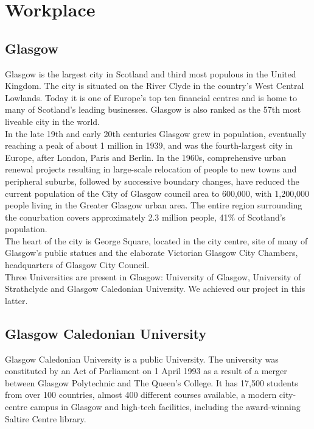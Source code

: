 \documentclass{scrreprt}
\begin{document}
		  \chapter{Workplace}
		  \section{Glasgow}%
		  Glasgow is the largest city in Scotland and third most populous in the United
		  Kingdom. The city is situated on the River Clyde in the country's West Central Lowlands.
		  Today it is one of Europe's top ten financial centres and is home to many of
		  Scotland's leading businesses. Glasgow is also ranked as the 57th most liveable city in the
		  world.\\

		  In the late 19th and early 20th centuries Glasgow grew in population, eventually
		  reaching a peak of about 1 million in 1939, and was the fourth-largest city in Europe, after
		  London, Paris and Berlin. In the 1960s, comprehensive urban renewal projects resulting in
		  large-scale relocation of people to new towns and peripheral suburbs, followed by
		  successive boundary changes, have reduced the current population of the City of Glasgow
		  council area to 600,000, with 1,200,000 people living in the Greater Glasgow urban area. The
		  entire region surrounding the conurbation covers approximately 2.3 million people, 41\% of
		  Scotland's population.\\

		  The heart of the city is George Square, located in the city centre, site of many of
		  Glasgow's public statues and the elaborate Victorian Glasgow City Chambers, headquarters
		  of Glasgow City Council.\\

		  Three Universities are present in Glasgow: University of Glasgow, University of
		  Strathclyde and Glasgow Caledonian University. We achieved our project in this latter.

		  \section{Glasgow Caledonian University}%
		  Glasgow Caledonian University is a public University. The university was constituted
		  by an Act of Parliament on 1 April 1993 as a result of a merger between Glasgow Polytechnic
		  and The Queen's College. It has 17,500 students from over 100 countries, almost 400
		  different courses available, a modern city-centre campus in Glasgow and high-tech facilities,
		  including the award-winning Saltire Centre library.
\end{document}
